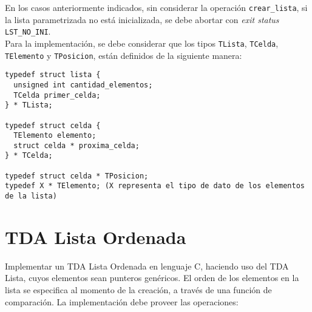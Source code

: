 \documentclass[12pt,a4paper]{article}
\begin{document}
En los casos anteriormente indicados, sin considerar la operación \texttt{crear\_lista}, si la lista parametrizada no está inicializada, se debe abortar con \emph{exit status} \texttt{LST\_NO\_INI}. \\

Para la implementación, se debe considerar que los tipos \texttt{TLista}, \texttt{TCelda},  \texttt{TElemento} y \texttt{TPosicion}, están definidos de la siguiente manera:

\begin{verbatim}
typedef struct lista {
  unsigned int cantidad_elementos;
  TCelda primer_celda;
} * TLista;

typedef struct celda {
  TElemento elemento;
  struct celda * proxima_celda;
} * TCelda;

typedef struct celda * TPosicion;
typedef X * TElemento; (X representa el tipo de dato de los elementos de la lista)

\end{verbatim}

\section{TDA Lista Ordenada}
Implementar un TDA Lista Ordenada en lenguaje C, haciendo uso del TDA Lista, cuyos elementos sean punteros genéricos. El orden de los elementos en la lista se especifica al momento de la creación, a través de una función de comparación. La implementación debe proveer las operaciones:
\end{document}
